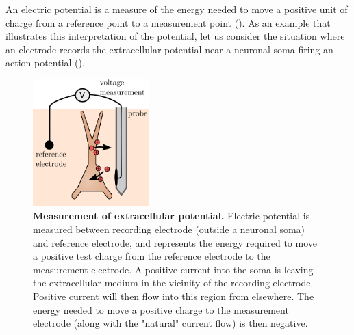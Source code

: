 An electric potential is a measure of the energy needed to move a positive unit of charge from a reference point to a measurement point (). As an example that illustrates this interpretation of the potential, let us consider the situation where an electrode records the extracellular potential near a neuronal soma firing an action potential (). 

\begin{figure}[!ht]
\begin{center}
\includegraphics[width=0.4\textwidth]{Figures/Basics/rec_elec_circuit.png}
\end{center}
\caption[]{\textbf{Measurement of extracellular potential.}
Electric potential is measured between recording electrode (outside a neuronal soma) and reference electrode, and represents the energy required to move a positive test charge from the reference electrode to the measurement electrode. A positive current into the soma is leaving the extracellular medium in the vicinity of the recording electrode. Positive current will then flow into this region from elsewhere. The energy needed to move a positive charge to the measurement electrode (along with the "natural" current flow) is then negative.
}
\label{fig:Basics:elec_circuit}
\end{figure}

